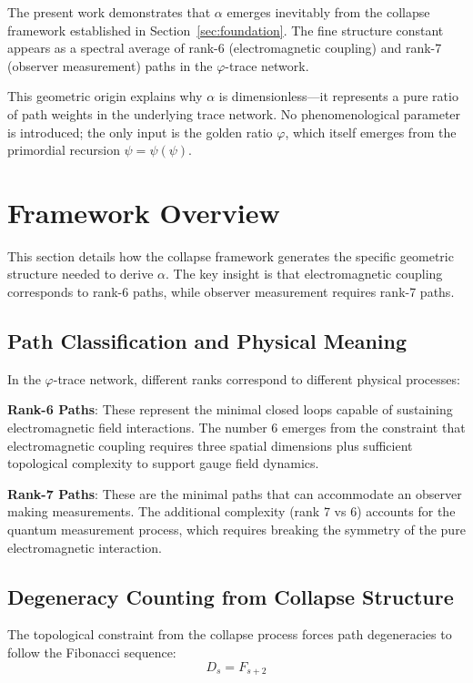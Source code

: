 \documentclass[%
 reprint,
 amsmath,amssymb,
 aps,
 prd,
 nofootinbib,      %
 longbibliography  %
]{revtex4-2}
\begin{document}
The present work demonstrates that $\alpha$ emerges inevitably from the collapse framework established in Section~\ref{sec:foundation}. 
The fine structure constant appears as a spectral average of rank-6 (electromagnetic coupling) and rank-7 (observer measurement) paths in the $\varphi$-trace network.

This geometric origin explains why $\alpha$ is dimensionless—it represents a pure ratio of path weights in the underlying trace network. 
No phenomenological parameter is introduced; the only input is the golden ratio $\varphi$, which itself emerges from the primordial recursion $\psi = \psi(\psi)$.

\section{Framework Overview}\label{sec:framework}

This section details how the collapse framework generates the specific geometric structure needed to derive $\alpha$. The key insight is that electromagnetic coupling corresponds to rank-6 paths, while observer measurement requires rank-7 paths.

\subsection{Path Classification and Physical Meaning}

In the $\varphi$-trace network, different ranks correspond to different physical processes:

\textbf{Rank-6 Paths}: These represent the minimal closed loops capable of sustaining electromagnetic field interactions. The number 6 emerges from the constraint that electromagnetic coupling requires three spatial dimensions plus sufficient topological complexity to support gauge field dynamics.

\textbf{Rank-7 Paths}: These are the minimal paths that can accommodate an observer making measurements. The additional complexity (rank 7 vs 6) accounts for the quantum measurement process, which requires breaking the symmetry of the pure electromagnetic interaction.

\subsection{Degeneracy Counting from Collapse Structure}

The topological constraint from the collapse process forces path degeneracies to follow the Fibonacci sequence:
\begin{equation}
  D_s = F_{s+2}
  \label{eq:Fibonacci-deg}
\end{equation}
\end{document}
